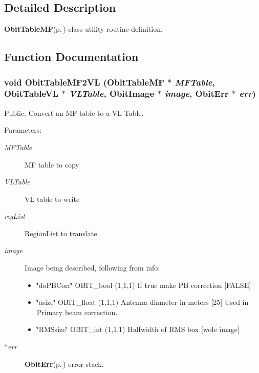 \subsection{Detailed Description}
{\bf Obit\-Table\-MF}{\rm (p.\,\pageref{structObitTableMF})} class utility routine definition. 



\subsection{Function Documentation}
\subsubsection{\setlength{\rightskip}{0pt plus 5cm}void Obit\-Table\-MF2VL ({\bf Obit\-Table\-MF} $\ast$ {\em MFTable}, {\bf Obit\-Table\-VL} $\ast$ {\em VLTable}, {\bf Obit\-Image} $\ast$ {\em image}, {\bf Obit\-Err} $\ast$ {\em err})}\label{ObitTableMFUtil_8h_a1}


Public: Convert an MF table to a VL Table. 

\begin{Desc}
\item[Parameters:]
\begin{description}
\item[{\em MFTable}]MF table to copy \item[{\em VLTable}]VL table to write \item[{\em reg\-List}]Region\-List to translate \item[{\em image}]Image being described, following from info: \begin{itemize}
\item \char`\"{}do\-PBCorr\char`\"{} OBIT\_\-bool (1,1,1) If true make PB correction [FALSE] \item \char`\"{}asize\char`\"{} OBIT\_\-float (1,1,1) Antenna diameter in meters [25] Used in Primary beam correction. \item \char`\"{}RMSsize\char`\"{} OBIT\_\-int (1,1,1) Halfwidth of RMS box [wole image] \end{itemize}
\item[{\em $\ast$err}]{\bf Obit\-Err}{\rm (p.\,\pageref{structObitErr})} error stack. \end{description}
\end{Desc}
